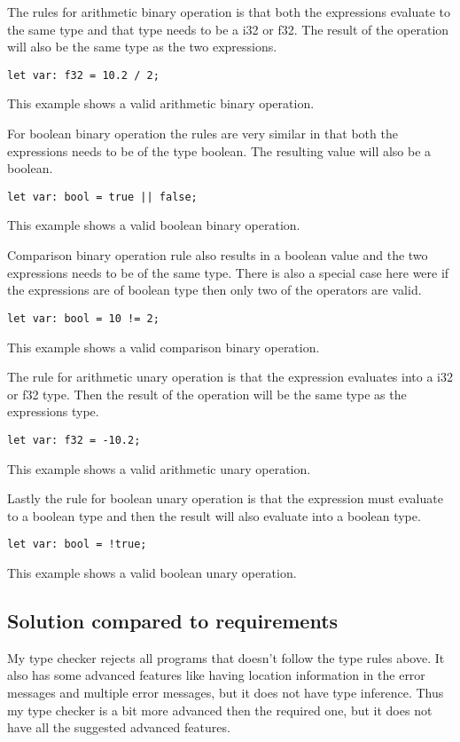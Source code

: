 \documentclass[12pt]{article}
\begin{document}
	The rules for arithmetic binary operation is that both the expressions evaluate to the same type and that type needs to be a i32 or f32. The result of the operation will also be the same type as the two expressions.
    	\begin{verbatim}
let var: f32 = 10.2 / 2;
    	\end{verbatim}
	This example shows a valid arithmetic binary operation.

	For boolean binary operation the rules are very similar in that both the expressions needs to be of the type boolean. The resulting value will also be a boolean.
    	\begin{verbatim}
let var: bool = true || false;
    	\end{verbatim}
	This example shows a valid boolean binary operation.

	Comparison binary operation rule also results in a boolean value and the two expressions needs to be of the same type. There is also a special case here were if the expressions are of boolean type then only two of the operators are valid.
    	\begin{verbatim}
let var: bool = 10 != 2;
    	\end{verbatim}
	This example shows a valid comparison binary operation.
	

	The rule for arithmetic unary operation is that the expression evaluates into a i32 or f32 type. Then the result of the operation will be the same type as the expressions type.
    	\begin{verbatim}
let var: f32 = -10.2;
    	\end{verbatim}
	This example shows a valid arithmetic unary operation.

	Lastly the rule for boolean unary operation is that the expression must evaluate to a boolean type and then the result will also evaluate into a boolean type.
    	\begin{verbatim}
let var: bool = !true;
    	\end{verbatim}
	This example shows a valid boolean unary operation.


	\subsection{Solution compared to requirements}
		My type checker rejects all programs that doesn't follow the type rules above. It also has some advanced features like having location information in the error messages and multiple error messages, but it does not have type inference. Thus my type checker is a bit more advanced then the required one, but it does not have all the suggested advanced features.
\end{document}
